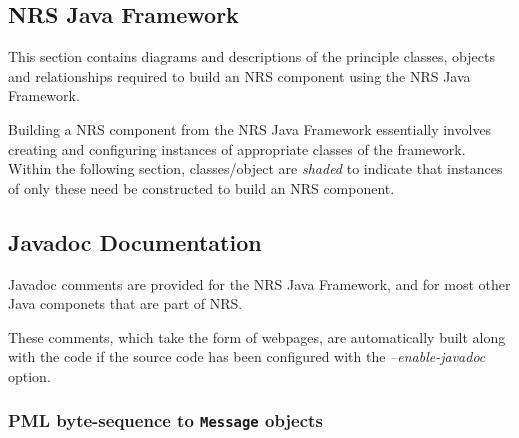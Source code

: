 \documentclass[pdftex,a4paper]{article}
\newif\ifpdf
\newcommand{\code}[1]{{\tt \small #1}}
\begin{document}
\ifpdf
\begin{figure}[htb]
  \begin{center}
    \texttt{[image: nrsgui\_basecompnode\_internal.pdf]}
    \caption{Partial UML depiction of message handling within an object
    derived from \code{BaseComponentNode}. NRS messages are represented
    internally within a Java application as \code{Message}
    objects. These arrive at a component-node object by its
    \code{deliver(...)}  method, which uses the \code{dispatch(...)}
    method to pass individual messages to an appropriate variable
    object. Each of these objects is an instance of a Java anonymous
    class inherited from \code{Variable}; these variables in turn
    forward messages to an appropriate message handler method defined
    within \code{BaseComponentNode}. These handler-methods undertake no
    processing; dervied classes should override them to provide
    application-specific functionality.}
    \label{pic:nrsgui_basecompnode_internal}
  \end{center}
\end{figure}
\fi

\subsection{NRS Java Framework}

This section contains diagrams and descriptions of the principle
classes, objects and relationships required to build an NRS component
using the NRS Java Framework.

Building a NRS component from the NRS Java Framework essentially
involves creating and configuring instances of appropriate classes of
the framework. Within the following section, classes/object are
\emph{shaded} to indicate that instances of only these need be
constructed to build an NRS component.

\subsection{Javadoc Documentation}

Javadoc comments are provided for the NRS Java Framework, and for most
other Java componets that are part of NRS.

These comments, which take the form of webpages, are automatically built
along with the code if the source code has been configured with the
\emph{--enable-javadoc} option.

\subsubsection{PML byte-sequence to \code{Message} objects}
\end{document}
